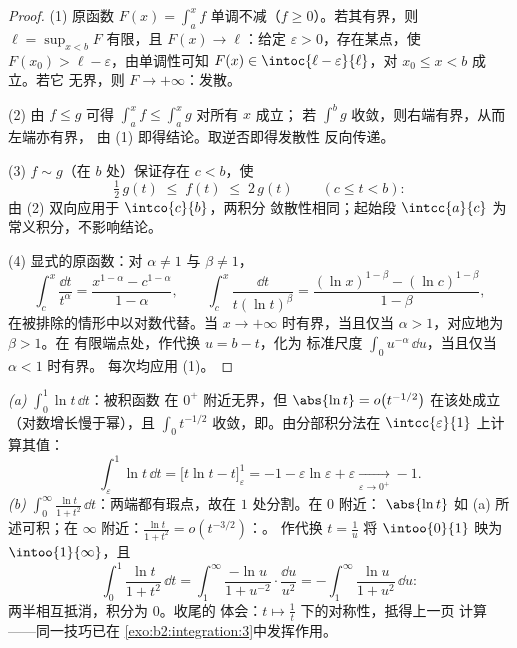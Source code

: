 \begin{proof}
(1) 原函数 $F(x) = \int_a^x f$ 单调不减（$f \geq
0$）。若其有界，则 $\ell = \sup_{x < b}F$ 有限，且
$F(x) \to \ell$：给定 $\varepsilon > 0$，存在某点，使 $F(x_0) > \ell -
\varepsilon$，由单调性可知 $F(x) \in
\intoc{\ell - \varepsilon}{\ell}$，对 $x_0 \leq x < b$ 成立。若它
无界，则 $F \to +\infty$：发散。

(2) 由 $f \leq g$ 可得 $\int_a^x f \leq \int_a^x g$ 对所有 $x$ 成立；
若 $\int^b g$ 收敛，则右端有界，从而左端亦有界，
由 (1) 即得结论。取逆否即得发散性
反向传递。

(3) $f \sim g$（在 $b$ 处）保证存在 $c < b$，使
\[
\tfrac12\,g(t) \;\leq\; f(t) \;\leq\; 2\,g(t)
\qquad (c \leq t < b) :
\]
由 (2) 双向应用于 $\intco{c}{b}$，两积分
敛散性相同；起始段 $\intcc{a}{c}$ 为
常义积分，不影响结论。

(4) 显式的原函数：对 $\alpha \neq 1$ 与 $\beta \neq 1$，
\[
\int_c^x \frac{\dd t}{t^\alpha}
= \frac{x^{1-\alpha} - c^{1-\alpha}}{1 - \alpha},
\qquad
\int_c^x \frac{\dd t}{t(\ln t)^\beta}
= \frac{(\ln x)^{1-\beta} - (\ln c)^{1-\beta}}{1 - \beta},
\]
在被排除的情形中以对数代替。当 $x \to
+\infty$ 时有界，当且仅当 $\alpha > 1$，对应地为 $\beta > 1$。在
有限端点处，作代换 $u = b - t$，化为
标准尺度 $\int_0 u^{-\alpha}\,\dd u$，当且仅当 $\alpha < 1$ 时有界。
每次均应用 (1)。
\end{proof}

\begin{example}\label{ex:b2:integration:warmups}
\emph{(a)} $\displaystyle\int_0^1 \ln t\,\dd t$：被积函数
在 $0^+$ 附近无界，但 $\abs{\ln t} = o\bigl(t^{-1/2}\bigr)$
在该处成立（对数增长慢于幂），且 $\int_0 t^{-1/2}$
收敛，即。由分部积分法在
$\intcc{\varepsilon}{1}$ 上计算其值：
\[
\int_\varepsilon^1 \ln t\,\dd t
= \bigl[t\ln t - t\bigr]_\varepsilon^1
= -1 - \varepsilon\ln\varepsilon + \varepsilon
\xrightarrow[\varepsilon\to0^+]{} -1 .
\]
\emph{(b)} $\displaystyle\int_0^\infty \frac{\ln t}{1 +
t^2}\,\dd t$：两端都有瑕点，故在 $1$ 处分割。在 $0$ 附近：
$\abs{\ln t}$ 如 (a) 所述可积；在 $\infty$ 附近：$\frac{\ln
t}{1+t^2} = o(t^{-3/2})$：。
作代换 $t = \frac1u$ 将 $\intoo{0}{1}$ 映为
$\intoo{1}{\infty}$，且
\[
\int_0^1 \frac{\ln t}{1+t^2}\,\dd t
= \int_1^{\infty} \frac{-\ln u}{1 + u^{-2}}\cdot
\frac{\dd u}{u^2}
= -\int_1^\infty \frac{\ln u}{1+u^2}\,\dd u :
\]
两半相互抵消，积分为 $0$。收尾的
体会：$t \mapsto \frac1t$ 下的对称性，抵得上一页
计算——同一技巧已在
\cref{exo:b2:integration:3}中发挥作用。
\end{example}


